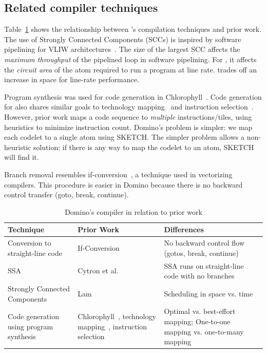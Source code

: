 
\subsection{Related compiler techniques}
\label{ss:related_compiler}
Table~\ref{tab:prior_compiler} shows the relationship between \pktlanguage's
compilation techniques and prior work. The use of Strongly Connected Components
(SCCs) is inspired by software pipelining for VLIW
architectures~\cite{software_pipelining}. The size of the largest SCC affects
the {\em maximum throughput} of the pipelined loop in software pipelining. For
\pktlanguage, it affects the {\em circuit area} of the atom required to run a
program at line rate. \pktlanguage trades off an increase in space for
line-rate performance.

Program synthesis was used for code generation in
Chlorophyll~\cite{chlorophyll}.  Code generation for \pktlanguage also shares
similar goals to technology mapping~\cite{micheli} and
instruction selection~\cite{muchnik}.  However, prior work maps a code sequence
to \textit{multiple} instructions/tiles, using heuristics to minimize
instruction count. Domino's problem is simpler: we map each codelet to a single
atom using SKETCH.  The simpler problem allows a non-heuristic solution: if
there is any way to map the codelet to an atom, SKETCH will find it.

Branch removal resembles if-conversion~\cite{if_conversion}, a
technique used in vectorizing compilers. This procedure is easier in Domino
because there is no backward control transfer (goto, break,
continue).

\begin{table}[!t]
  \begin{scriptsize}
    \begin{tabular}{|p{}|p{}|p{}|}
  \hline
  Technique & Prior Work & Differences \\
  \hline
  Conversion to straight-line code & If-Conversion~\cite{if_conversion} & No backward control flow (gotos, break, continue) \\
  \hline
  SSA & Cytron et al.~\cite{ssa} & SSA runs on straight-line code with no branches \\
  \hline
  Strongly Connected Components & Lam~\cite{software_pipelining} & Scheduling in space vs. time \\
  \hline
  Code generation using program synthesis & Chlorophyll~\cite{chlorophyll}, technology mapping~\cite{micheli}, instruction selection~\cite{muchnik} & Optimal vs. best-effort mapping; One-to-one mapping vs. one-to-many mapping \\
  \hline
  \end{tabular}
  \end{scriptsize}
  \caption{Domino's compiler in relation to prior work}
  \label{tab:prior_compiler}
\end{table}
